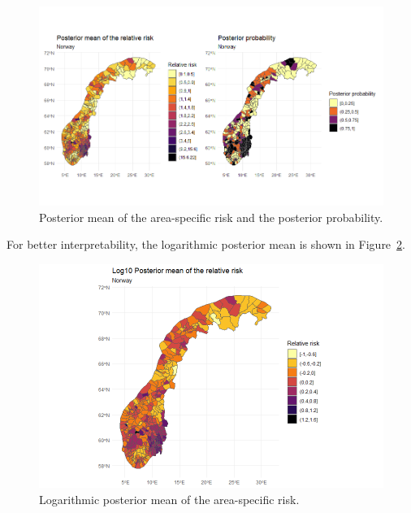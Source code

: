 \begin{figure}[H]
    \centering
    \includegraphics[width = \textwidth]{posterior_norway.png}
    \caption{Posterior mean of the area-specific risk and the posterior probability.}
    \label{posteriorNorway}
\end{figure}
%     
For better interpretability, the logarithmic posterior mean is shown in Figure~\ref{posteriorNorwayLog}.
\begin{figure}[H]
    \centering
    \includegraphics[width = \textwidth]{posterior_norway_log.png}
    \caption{Logarithmic posterior mean of the area-specific risk.}
    \label{posteriorNorwayLog}
\end{figure}
%     
